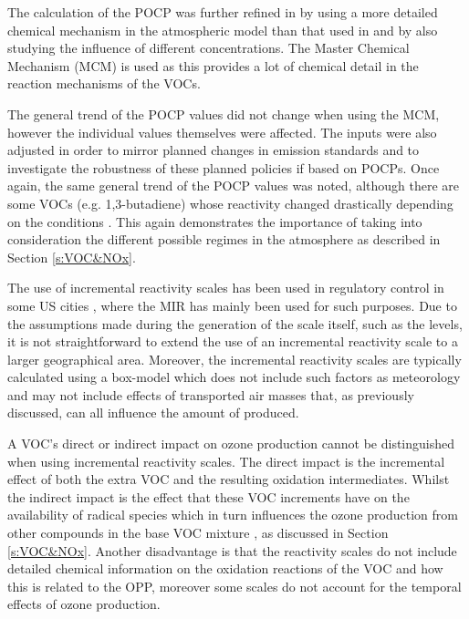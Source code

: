 The calculation of the POCP was further refined in \citep{Derwent:1998} by using a more detailed chemical mechanism in the 
atmospheric model than that used in \citep{Derwent:1996} and by also studying the influence of different  
concentrations. The Master Chemical Mechanism (MCM) is used as this provides a lot of chemical detail in the reaction 
mechanisms of the VOCs. 

The general trend of the POCP values did not change when using the MCM, however the individual values themselves were affected.
The  inputs were also adjusted in order to mirror planned changes in  emission standards and to investigate 
the robustness of these planned policies if based on POCPs. Once again, the same general trend of the POCP values was noted, 
although there are some VOCs (e.g. 1,3-butadiene) whose reactivity changed drastically depending on the  conditions 
\citep{Derwent:1998}. This again demonstrates the importance of taking into consideration the different possible regimes in the 
atmosphere as described in Section \ref{s:VOC&NOx}.

The use of incremental reactivity scales has been used in regulatory control in some US cities \citep{Luecken:2008}, where the 
MIR has mainly been used for such purposes. Due to the assumptions made during the generation of the scale itself, such as the 
 levels, it is not straightforward to extend the use of an incremental reactivity scale to a larger geographical area.
Moreover, the incremental reactivity scales are typically calculated using a box-model which does not include such factors as 
meteorology and may not include effects of transported air masses that, as previously discussed, can all influence the amount 
of  produced. 

A VOC's direct or indirect impact on ozone production cannot be distinguished when using incremental reactivity scales. The 
direct impact is the incremental effect of both the extra VOC and the resulting oxidation intermediates. Whilst the indirect 
impact is the effect that these VOC increments have on the availability of radical species which in turn influences the ozone 
production from other compounds in the base VOC mixture \citep{Butler:2011}, as discussed in Section \ref{s:VOC&NOx}. Another 
disadvantage is that the reactivity scales do not include detailed chemical information on the oxidation reactions of the VOC 
and how this is related to the OPP, moreover some scales do not account for the temporal effects of ozone production.

